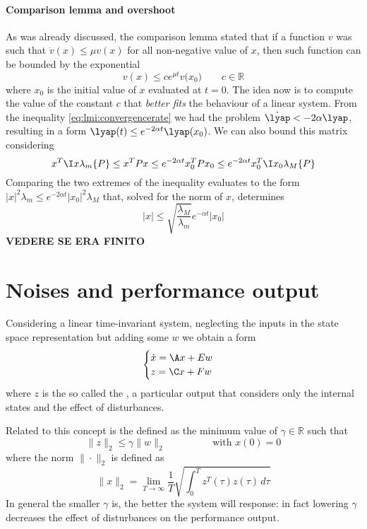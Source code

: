 	\paragraph{Comparison lemma and overshoot} As was already discussed, the comparison lemma stated that if a function $v$ was such that $\dot v(x) \leq \mu v(x)$ for all non-negative value of $x$, then such function can be bounded by the exponential
	\[ v(x) \leq c e^{\mu t} v\big(x_0\big) \qquad c \in \mathds R \]
	where $x_0$ is the initial value of $x$ evaluated at $t=0$. The idea now is to compute the value of the constant $c$ that \textit{better fits} the behaviour of a linear system. From the inequality \ref{eq:lmi:convergencerate} we had the problem $\dot \lyap < - 2\alpha \lyap$, resulting in a form $\lyap(t) \leq e^{-2\alpha t} \lyap(x_0)$. We can also bound this matrix considering 
	\[ x^T \I x \lambda_m\{P\} \leq x^TPx \leq e^{-2\alpha t}x_0^T P x_0 \leq e^{-2\alpha t} x_0^T \I x_0 \lambda_M\{P\}  \]
	Comparing the two extremes  of the inequality evaluates to the form $|x|^2 \lambda_m \leq e^{-2\alpha t} |x_0|^2 \lambda_M$ that, solved for the norm of $x$, determines
	\begin{equation}
		|x| \leq \sqrt{\frac{\lambda_M}{\lambda_m}} e^{-\alpha t} |x_0|
	\end{equation}
	\textbf{VEDERE SE ERA FINITO}
	
\section{Noises and performance output}
	Considering a linear time-invariant system, neglecting the inputs in the state space representation but adding some  $w$ we obtain a form
	\begin{equation}
	\begin{cases}
		\dot x = \A x + E w \\ z = \C x + F w
	\end{cases}
	\end{equation}
	where $z$ is the so called the , a particular output that considers only the internal states and the effect of disturbances.
	
	Related to this concept is the  defined as the minimum value of $\gamma \in \mathds R$ such that 
	\begin{equation}
		\|z\|_2 \leq \gamma \| w \|_2 \hspace{2cm} \textrm{with } x(0) = 0
	\end{equation}
	where the norm $\|\cdot\|_2$ is defined as
	\[ \|x\|_2 = \lim_{T\rightarrow\infty} \frac 1 T \sqrt{\int_0^T z^T(\tau) z(\tau)\, d\tau} \]
	In general the smaller $\gamma$ is, the better the system will response: in fact lowering $\gamma$ decreases the effect of disturbances on the performance output.
	
